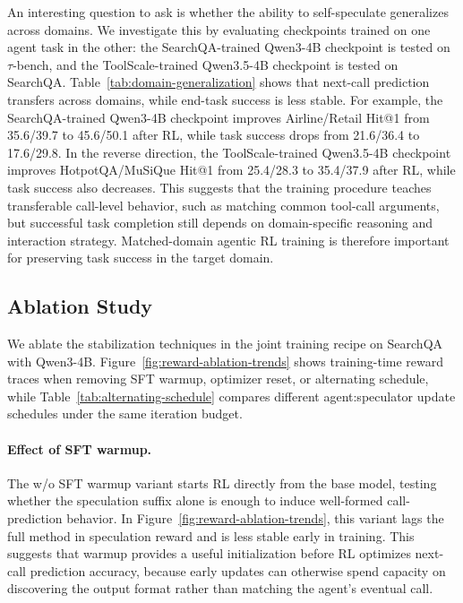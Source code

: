 An interesting question to ask is whether the ability to self-speculate
generalizes across domains. We investigate this by evaluating checkpoints
trained on one agent task in the other: the SearchQA-trained Qwen3-4B checkpoint
is tested on $\tau$-bench, and the ToolScale-trained Qwen3.5-4B checkpoint is
tested on SearchQA. Table~\ref{tab:domain-generalization} shows that next-call
prediction transfers across domains, while end-task success is less stable. For
example, the SearchQA-trained Qwen3-4B checkpoint improves Airline/Retail Hit@1
from 35.6/39.7 to 45.6/50.1 after RL, while task success drops from 21.6/36.4
to 17.6/29.8. In the reverse direction, the ToolScale-trained Qwen3.5-4B
checkpoint improves HotpotQA/MuSiQue Hit@1 from 25.4/28.3 to 35.4/37.9 after
RL, while task success also decreases. This suggests that the training procedure
teaches transferable call-level behavior, such as matching common tool-call
arguments, but successful task completion still depends on domain-specific
reasoning and interaction strategy. Matched-domain agentic RL training is
therefore important for preserving task success in the target domain.



\subsection{Ablation Study}
\label{sec:ablation}

We ablate the stabilization techniques in the joint training recipe on SearchQA
with Qwen3-4B.
Figure~\ref{fig:reward-ablation-trends} shows training-time reward traces when
removing SFT warmup, optimizer reset, or alternating schedule, while
Table~\ref{tab:alternating-schedule} compares different agent:speculator update
schedules under the same iteration budget.

\paragraph{Effect of SFT warmup.}
The w/o SFT warmup variant starts RL directly from the base model, testing
whether the speculation suffix alone is enough to induce well-formed
call-prediction behavior. In Figure~\ref{fig:reward-ablation-trends}, this
variant lags the full method in speculation reward and is less stable early in
training. This suggests that warmup provides a useful initialization before RL
optimizes next-call prediction accuracy, because early updates can otherwise
spend capacity on discovering the output format rather than matching the
agent's eventual call.

